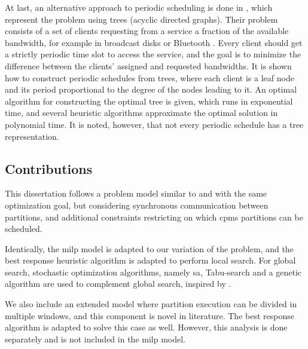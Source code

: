 \documentclass[main.tex]{subfiles}
\begin{document}
At last, an alternative approach to periodic scheduling is done in \textcite{bar2004efficient}, which represent the problem using trees (acyclic directed graphs). 
Their problem consists of a set of clients requesting from a service a fraction of the available bandwidth, for example in broadcast disks or Bluetooth .
Every client should get a strictly periodic time slot to access the service, and the goal is to minimize the difference between the clients' assigned and requested bandwidths.
It is shown how to construct periodic schedules from trees, where each client is a leaf node and its period proportional to the degree of the nodes leading to it.
An optimal algorithm for constructing the optimal tree is given, which runs in exponential time, and several heuristic algorithms approximate the optimal solution in polynomial time.
It is noted, however, that not every periodic schedule has a tree representation.

\subsection{Contributions}

This dissertation follows a problem model similar to \textcite{al2010partition} and with the same optimization goal, but considering synchronous communication between partitions, and additional constraints restricting on which \glspl{cpm} partitions can be scheduled.

Identically, the \gls{milp} model is adapted to our variation of the problem, and the best response heuristic algorithm \cite{al2012strictly, pira2016line} is adapted to perform local search.
For global search, stochastic optimization algorithms, namely \gls{sa}, Tabu-search and a genetic algorithm are used to complement global search, inspired by \textcite{pinedo2008scheduling}.

We also include an extended model where partition execution can be divided in multiple windows, and this component is novel in literature.
The best response algorithm is adapted to solve this case as well.
However, this analysis is done separately and is not included in the \gls{milp} model.
\end{document}
